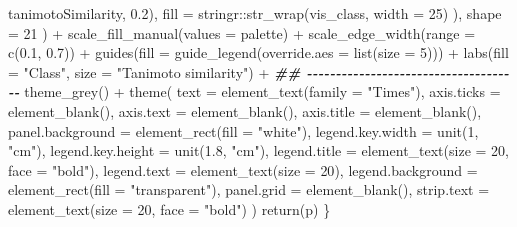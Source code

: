 \documentclass[
]{article}
\newenvironment{Shaded}{\begin{snugshade}}{\end{snugshade}}
\newcommand{\AttributeTok}[1]{\textcolor[rgb]{0.77,0.63,0.00}{#1}}
\newcommand{\DecValTok}[1]{\textcolor[rgb]{0.00,0.00,0.81}{#1}}
\newcommand{\DocumentationTok}[1]{\textcolor[rgb]{0.56,0.35,0.01}{\textbf{\textit{#1}}}}
\newcommand{\FloatTok}[1]{\textcolor[rgb]{0.00,0.00,0.81}{#1}}
\newcommand{\FunctionTok}[1]{\textcolor[rgb]{0.00,0.00,0.00}{#1}}
\newcommand{\NormalTok}[1]{#1}
\newcommand{\SpecialCharTok}[1]{\textcolor[rgb]{0.00,0.00,0.00}{#1}}
\newcommand{\StringTok}[1]{\textcolor[rgb]{0.31,0.60,0.02}{#1}}
\begin{document}
\begin{Shaded}
\begin{Highlighting}[]
\NormalTok{                                        tanimotoSimilarity, }\FloatTok{0.2}\NormalTok{),}
                          \AttributeTok{fill =}\NormalTok{ stringr}\SpecialCharTok{::}\FunctionTok{str\_wrap}\NormalTok{(vis\_class, }\AttributeTok{width =} \DecValTok{25}\NormalTok{)}
\NormalTok{                          ),}
                      \AttributeTok{shape =} \DecValTok{21}
\NormalTok{                      ) }\SpecialCharTok{+} 
      \FunctionTok{scale\_fill\_manual}\NormalTok{(}\AttributeTok{values =}\NormalTok{ palette) }\SpecialCharTok{+}
      \FunctionTok{scale\_edge\_width}\NormalTok{(}\AttributeTok{range =} \FunctionTok{c}\NormalTok{(}\FloatTok{0.1}\NormalTok{, }\FloatTok{0.7}\NormalTok{)) }\SpecialCharTok{+} 
      \FunctionTok{guides}\NormalTok{(}\AttributeTok{fill =} \FunctionTok{guide\_legend}\NormalTok{(}\AttributeTok{override.aes =} \FunctionTok{list}\NormalTok{(}\AttributeTok{size =} \DecValTok{5}\NormalTok{))) }\SpecialCharTok{+}
      \FunctionTok{labs}\NormalTok{(}\AttributeTok{fill =} \StringTok{"Class"}\NormalTok{, }\AttributeTok{size =} \StringTok{"Tanimoto similarity"}\NormalTok{) }\SpecialCharTok{+}
      \DocumentationTok{\#\# {-}{-}{-}{-}{-}{-}{-}{-}{-}{-}{-}{-}{-}{-}{-}{-}{-}{-}{-}{-}{-}{-}{-}{-}{-}{-}{-}{-}{-}{-}{-}{-}{-}{-}{-}{-}{-} }
      \FunctionTok{theme\_grey}\NormalTok{() }\SpecialCharTok{+}
      \FunctionTok{theme}\NormalTok{(}
            \AttributeTok{text =} \FunctionTok{element\_text}\NormalTok{(}\AttributeTok{family =} \StringTok{"Times"}\NormalTok{),}
            \AttributeTok{axis.ticks =} \FunctionTok{element\_blank}\NormalTok{(),}
            \AttributeTok{axis.text =} \FunctionTok{element\_blank}\NormalTok{(),}
            \AttributeTok{axis.title =} \FunctionTok{element\_blank}\NormalTok{(),}
            \AttributeTok{panel.background =} \FunctionTok{element\_rect}\NormalTok{(}\AttributeTok{fill =} \StringTok{"white"}\NormalTok{),}
            \AttributeTok{legend.key.width =} \FunctionTok{unit}\NormalTok{(}\DecValTok{1}\NormalTok{, }\StringTok{"cm"}\NormalTok{),}
            \AttributeTok{legend.key.height =} \FunctionTok{unit}\NormalTok{(}\FloatTok{1.8}\NormalTok{, }\StringTok{"cm"}\NormalTok{),}
            \AttributeTok{legend.title =} \FunctionTok{element\_text}\NormalTok{(}\AttributeTok{size =} \DecValTok{20}\NormalTok{, }\AttributeTok{face =} \StringTok{"bold"}\NormalTok{),}
            \AttributeTok{legend.text =} \FunctionTok{element\_text}\NormalTok{(}\AttributeTok{size =} \DecValTok{20}\NormalTok{),}
            \AttributeTok{legend.background =} \FunctionTok{element\_rect}\NormalTok{(}\AttributeTok{fill =} \StringTok{"transparent"}\NormalTok{),}
            \AttributeTok{panel.grid =} \FunctionTok{element\_blank}\NormalTok{(),}
            \AttributeTok{strip.text =} \FunctionTok{element\_text}\NormalTok{(}\AttributeTok{size =} \DecValTok{20}\NormalTok{, }\AttributeTok{face =} \StringTok{"bold"}\NormalTok{)}
\NormalTok{      )}
    \FunctionTok{return}\NormalTok{(p)}
\NormalTok{  \}}
\end{Highlighting}
\end{Shaded}
\end{document}
